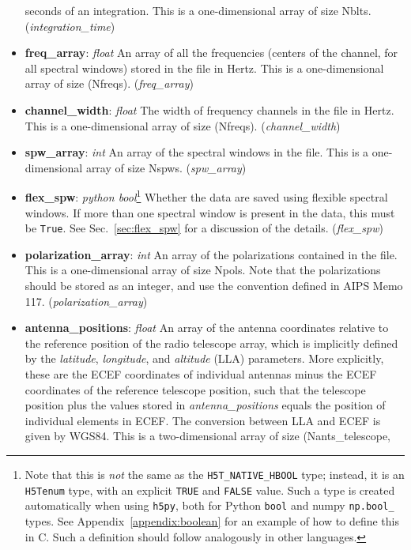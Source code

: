 \documentclass[11pt, oneside]{article}
\begin{document}
\begin{itemize}
  seconds of an integration. This is a one-dimensional array of size
  Nblts. (\textit{integration\_time})
\item \textbf{freq\_array}: \textit{float} An array of all the frequencies (centers
  of the channel, for all spectral windows) stored in the file in Hertz. This is a
  one-dimensional array of size (Nfreqs). (\textit{freq\_array})
\item \textbf{channel\_width}: \textit{float} The width of frequency channels in
  the file in Hertz. This is a one-dimensional array of size
  (Nfreqs). (\textit{channel\_width})
\item \textbf{spw\_array}: \textit{int} An array of the spectral windows in the
  file. This is a one-dimensional array of size Nspws. (\textit{spw\_array})
\item \textbf{flex\_spw}: \textit{python bool}\footnote{Note that this is
    \textit{not} the same as the \texttt{H5T\_NATIVE\_HBOOL} type; instead, it
    is an \texttt{H5Tenum} type, with an explicit \texttt{TRUE} and
    \texttt{FALSE} value. Such a type is created automatically when using
    \texttt{h5py}, both for Python \texttt{bool} and numpy \texttt{np.bool\_}
    types. See Appendix~\ref{appendix:boolean} for an example of how to define
    this in C. Such a definition should follow analogously in other languages.}
  Whether the data are saved using flexible spectral windows. If more than one
  spectral window is present in the data, this must be \texttt{True}. See
  Sec.~\ref{sec:flex_spw} for a discussion of the details. (\textit{flex\_spw})
\item \textbf{polarization\_array}: \textit{int} An array of the polarizations
  contained in the file. This is a one-dimensional array of size Npols. Note
  that the polarizations should be stored as an integer, and use the convention
  defined in AIPS Memo 117. (\textit{polarization\_array})
\item \textbf{antenna\_positions}: \textit{float} An array of the antenna
  coordinates relative to the reference position of the radio telescope array,
  which is implicitly defined by the \textit{latitude}, \textit{longitude}, and
  \textit{altitude} (LLA) parameters. More explicitly, these are the ECEF
  coordinates of individual antennas minus the ECEF coordinates of the reference
  telescope position, such that the telescope position plus the values stored in
  \textit{antenna\_positions} equals the position of individual elements in
  ECEF. The conversion between LLA and ECEF is given by WGS84. This is a
  two-dimensional array of size (Nants\_telescope,

\end{itemize}
\end{document}
